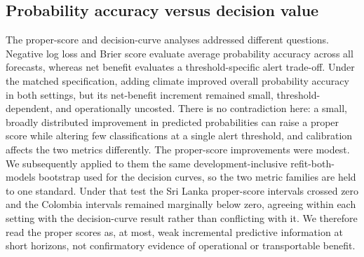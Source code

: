 \documentclass[11pt,a4paper]{article}
\begin{document}
\subsection*{Probability accuracy versus decision value}
The proper-score and decision-curve analyses addressed different questions. Negative log loss and Brier score evaluate average probability accuracy across all forecasts, whereas net benefit evaluates a threshold-specific alert trade-off. Under the matched specification, adding climate improved overall probability accuracy in both settings, but its net-benefit increment remained small, threshold-dependent, and operationally uncosted. There is no contradiction here: a small, broadly distributed improvement in predicted probabilities can raise a proper score while altering few classifications at a single alert threshold, and calibration affects the two metrics differently. The proper-score improvements were modest. We subsequently applied to them the same development-inclusive refit-both-models bootstrap used for the decision curves, so the two metric families are held to one standard. Under that test the Sri Lanka proper-score intervals crossed zero and the Colombia intervals remained marginally below zero, agreeing within each setting with the decision-curve result rather than conflicting with it. We therefore read the proper scores as, at most, weak incremental predictive information at short horizons, not confirmatory evidence of operational or transportable benefit.
\end{document}
